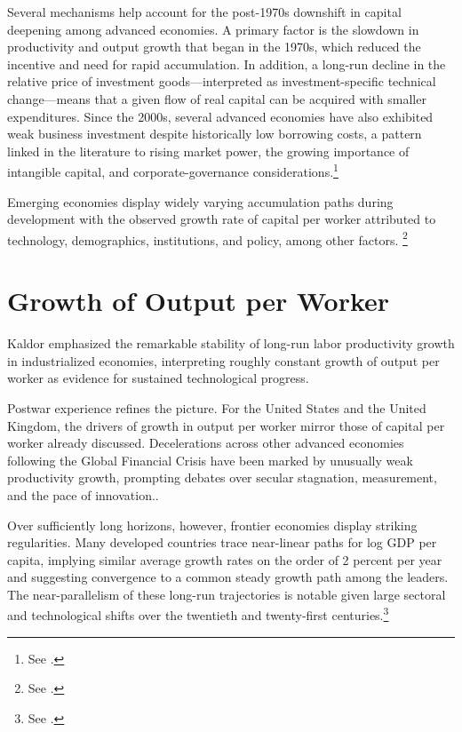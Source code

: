 \documentclass[\topdir/lecture\_notes.tex]{subfiles}
\begin{document}
Several mechanisms help account for the post-1970s downshift in capital deepening among advanced economies.
A primary factor is the slowdown in productivity and output growth that began in the 1970s, which reduced the incentive and need for rapid accumulation.
In addition, a long-run decline in the relative price of investment goods---interpreted as investment-specific technical change---means that a given flow of real capital can be acquired with smaller expenditures.
Since the 2000s, several advanced economies have also exhibited weak business investment despite historically low borrowing costs, a pattern linked in the literature to rising market power, the growing importance of intangible capital, and corporate-governance considerations.\footnote{See \parencite{greenwoodhercowitzkrusell1997,byrneolinersichel2017,gutierrezphilippon2017,crouzeteberly2019,deloecker2020markups,corradohultensichel2005,karabarbounis2014global,eggertsson2018kaldor,gordon2016rise,fernald2015productivity,oecd2015productivity}.}

Emerging economies display widely varying accumulation paths during development with the observed growth rate of capital per worker attributed to technology, demographics, institutions, and policy, among other factors. \footnote{See \parencite{solow1956contribution,barrosalaimartin2003,acemoglu2009growth,jones2016facts}.}

\section{Growth of Output per Worker}

Kaldor emphasized the remarkable stability of long-run labor productivity growth in industrialized economies, interpreting roughly constant growth of output per worker as evidence for sustained technological progress.

Postwar experience refines the picture.
For the United States and the United Kingdom, the drivers of growth in output per worker mirror those of capital per worker already discussed.
Decelerations across other advanced economies following the Global Financial Crisis have been marked by unusually weak productivity growth, prompting debates over secular stagnation, measurement, and the pace of innovation.\parencite{oecd2015productivity,gordon2016rise,byrnefernaldreinsdorf2016,syverson2017}. 

Over sufficiently long horizons, however, frontier economies display striking regularities.
Many developed countries trace near-linear paths for log GDP per capita, implying similar average growth rates on the order of 2 percent per year and suggesting convergence to a common steady growth path among the leaders.
The near-parallelism of these long-run trajectories is notable given large sectoral and technological shifts over the twentieth and twenty-first centuries.\footnote{See \parencite{vollrath2020fullygrown,jones2016facts}.}
\end{document}
